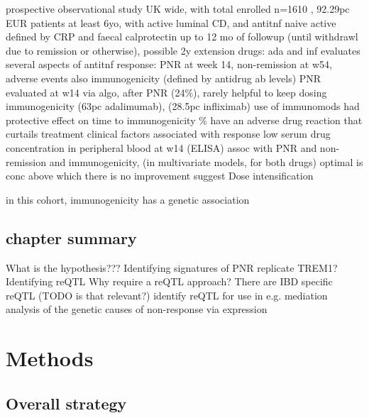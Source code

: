 \begin{outline}
\1 prospective observational study UK wide, with total enrolled n=1610 , 92.29pc EUR \autocite{kennedy2019PredictorsAntiTNFTreatment}
    \2 patients at least 6yo, with active luminal CD, and antitnf naive
        \3 active defined by CRP and faecal calprotectin
    \2 up to 12 mo of followup (until withdrawl due to remission or otherwise), possible 2y extension
     drugs: ada and inf
    \2 evaluates several aspects of antitnf response: PNR at week 14, non-remission at w54, adverse events
        \3 also immunogenicity (defined by antidrug ab levels)
    \2 PNR evaluated at w14 via algo, after PNR (24\%), rarely helpful to keep dosing
    \2 immunogenicity (63pc adalimumab), (28.5pc infliximab)
        \3 use of immunomods had protective effect on time to immunogenicity 
    \% have an adverse drug reaction that curtails treatment
    \2 clinical factors associated with response
        \3 low serum drug concentration in peripheral blood at w14 (ELISA) assoc with PNR and non-remission and immunogenicity, (in multivariate models, for both drugs) 
        \3 optimal is conc above which there is no improvement
    \2 suggest Dose intensification

\1 in this cohort, immunogenicity has a genetic association \autocite{sazonovs2019HLADQA105Carriage} 

\subsection{chapter summary}

\1 What is the hypothesis???
\1 Identifying signatures of PNR
    \2 replicate TREM1?
\1 Identifying reQTL
    \2 Why require a reQTL approach?
    \2 There are IBD specific reQTL (TODO is that relevant?) \autocite{piasecka2018DistinctiveRolesAge}
    \2 identify reQTL for use in e.g. mediation analysis of the genetic causes of non-response via expression

\section{Methods}

\subsection{Overall strategy}


\end{outline}
